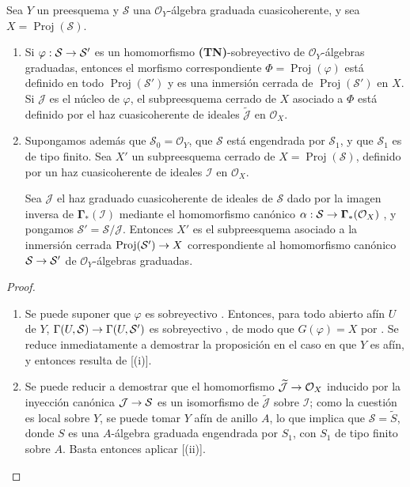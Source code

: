 \documentclass[oneside,10pt]{amsart}
\makeatletter
\newcommand{\ega@arrow}[2]{\mathchoice{#1}{#2}{#2}{#2}}
\renewcommand{\to}{\ega@arrow{\longrightarrow}{\rightarrow}}
\newcommand{\oldpage}[2][]{\marginnote{\normalfont\footnotesize\textbf{#1}~|~#2}\ignorespaces}
\let\EGAOriginalLabel\label
\renewcommand{\label}[1]{\phantomsection\EGAOriginalLabel{#1}}
\makeatother
\begin{document}
\begin{proposition}[3.6.2]
\label{II.3.6.2-fr}
Sea $Y$ un preesquema y $\mathcal{S}$ una $\mathcal{O}_Y$-álgebra graduada cuasicoherente, y sea $X=\operatorname{Proj}(\mathcal{S})$.
\begin{enumerate}
  \item[(i)] Si $\varphi:\mathcal{S}\to\mathcal{S}'$ es un homomorfismo \textup{\textbf{(TN)}}-sobreyectivo de $\mathcal{O}_Y$-álgebras graduadas, entonces el morfismo correspondiente $\Phi=\operatorname{Proj}(\varphi)$  está definido en todo $\operatorname{Proj}(\mathcal{S}')$ y es una inmersión cerrada de $\operatorname{Proj}(\mathcal{S}')$ en $X$.
    Si $\mathcal{J}$ es el núcleo de $\varphi$, el subpreesquema cerrado de $X$ asociado a $\Phi$ está definido por el haz cuasicoherente de ideales $\widetilde{\mathcal{J}}$ en $\mathcal{O}_X$.
  \item[(ii)] Supongamos además que $\mathcal{S}_0=\mathcal{O}_Y$, que $\mathcal{S}$ está engendrada por $\mathcal{S}_1$, y que $\mathcal{S}_1$ es de tipo finito.
    Sea $X'$ un subpreesquema cerrado de $X=\operatorname{Proj}(\mathcal{S})$, definido por un haz cuasicoherente de ideales $\mathcal{I}$ en $\mathcal{O}_X$.
    
    Sea $\mathcal{J}$ 
\oldpage[II]{65}
el haz graduado cuasicoherente de ideales de $\mathcal{S}$ dado por la imagen inversa de $\mathbf{\Gamma}_*(\mathcal{I})$ mediante el homomorfismo canónico $\alpha:\mathcal{S}\to\mathbf{\Gamma}_*(\mathcal{O}_X)$ , y pongamos $\mathcal{S}'=\mathcal{S}/\mathcal{J}$.
    Entonces $X'$ es el subpreesquema asociado  a la inmersión cerrada $\operatorname{Proj}(\mathcal{S}')\to X$ correspondiente al homomorfismo canónico $\mathcal{S}\to\mathcal{S}'$ de $\mathcal{O}_Y$-álgebras graduadas.
\end{enumerate}
\end{proposition}

\begin{proof}
\medskip\noindent
\begin{enumerate}
  \item[(i)] Se puede suponer que $\varphi$ es sobreyectivo .
    Entonces, para todo abierto afín $U$ de $Y$, $\Gamma(U,\mathcal{S})\to\Gamma(U,\mathcal{S}')$ es sobreyectivo , de modo que $G(\varphi)=X$ por .
    Se reduce inmediatamente a demostrar la proposición en el caso en que $Y$ es afín, y entonces resulta de [(i)].
  \item[(ii)] Se puede reducir a demostrar que el homomorfismo $\widetilde{\mathcal{J}}\to\mathcal{O}_X$ inducido por la inyección canónica $\mathcal{J}\to\mathcal{S}$ es un isomorfismo de $\widetilde{\mathcal{J}}$ sobre $\mathcal{I}$; como la cuestión es local sobre $Y$, se puede tomar $Y$ afín de anillo $A$, lo que implica que $\mathcal{S}=\widetilde{S}$, donde $S$ es una $A$-álgebra graduada engendrada por $S_1$, con $S_1$ de tipo finito sobre $A$.
    Basta entonces aplicar [(ii)].
\end{enumerate}
\end{proof}
\end{document}
